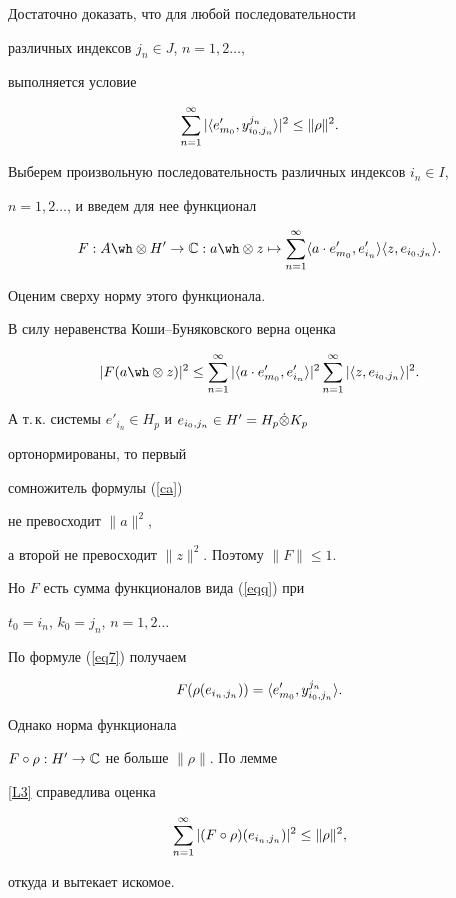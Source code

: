\begin{pf}


Достаточно доказать, что для любой последовательности 


различных индексов $j_n \in J$, $n=1,2\dotsc$,


выполняется условие


$$


\sumjni |\lan e'_{m_0},y^{j_n}_{i_0,j_n} \ran |^2 \le \| \rho\|^2.


$$


Выберем произвольную последовательность различных индексов $i_n \in I$,


$n=1,2\dotsc$, и введем для нее функционал


$$


F: A \tens H' \to\Bbb C: a \tens z \mapsto \sumjni \lan a \cd e'_{m_0},


e'_{i_n} \ran \lan z,e_{i_0,j_n} \ran.


$$


Оценим сверху норму этого функционала.


В силу неравенства Коши--Буняковского верна оценка


\begin{equation}


\label{ca}


|F(a \tens z)|^2 \le \sumjni |


\lan a \cd e'_{m_0},e'_{i_n} \ran |^2 \sumjni | \lan z,e_{i_0,j_n} \ran |^2.


\end{equation}


А т.\,к. системы $e'_{i_n} \in H_p$ и $e_{i_0,j_n} \in H'=H_p \Dot \otimes K_p$


ортонормированы, то первый


сомножитель формулы (\ref{ca})


не превосходит $\| a\|^2$,


а второй не превосходит $\| z\|^2$. Поэтому $\| F\| \le 1$.


Но $F$ есть сумма функционалов вида (\ref{eqq}) при


$t_0=i_n$, $k_0=j_n$, $n=1,2\dotsc$


По формуле (\ref{eq7}) получаем


$$


F(\rho


(e_{i_n,j_n}))= \lan e'_{m_0},y^{j_n}_{i_0,j_n} \ran.


$$


Однако норма функционала


$F \circ \rho :H' \to\Bbb C$ не больше $\| \rho \|$. По лемме


\ref{L3} справедлива оценка


$$


\sumjni |(F \circ \rho ) (e_{i_n,j_n})|^2


\le \| \rho \|^2,


$$


откуда и вытекает искомое.


\end{pf}






